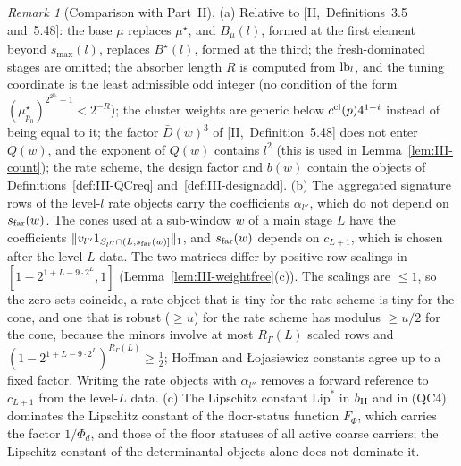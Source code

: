 \documentclass[10pt]{amsart}
\theoremstyle{definition}
\theoremstyle{remark}
\newtheorem{remark}[theorem]{Remark}
\begin{document}
\begin{remark}[Comparison with Part~II]\label{rem:III-Tfincomp}
(a) Relative to [II,~Definitions~3.5 and~5.48]: the base $\mu$ replaces
$\mu^\star$, and $B_\mu(l)$, formed at the first element beyond $s_{\max}(l)$,
replaces $B^\star(l)$, formed at the third; the fresh-dominated stages are
omitted; the absorber length $R$ is computed from ${\rm lb}_l$, and the tuning
coordinate is the least admissible odd integer (no condition of the form
$(\mu^\star_{p_0})^{2^{2^{p_0}}-1}<2^{-R}$); the cluster weights are generic
below $c^{\rm cl}(p)4^{1-i}$ instead of being equal to it; the factor
$\bar D(w)^3$ of [II,~Definition~5.48] does not enter $Q(w)$, and the
exponent of $Q(w)$ contains $l^2$ (this is used in
Lemma~\ref{lem:III-count}); the rate scheme, the design factor and $b(w)$
contain the objects of Definitions~\ref{def:III-QCreq}
and~\ref{def:III-designadd}.
(b) The aggregated signature rows of the level-$l$ rate objects carry the
coefficients $\alpha_{l''}$, which do not depend on $s_{\rm far}(w)$.  The cones
used at a sub-window $w$ of a main stage $L$ have the coefficients
$\|v_{l''}1_{S_{l''}\cap(L,s_{\rm far}(w)]}\|_1$, and $s_{\rm far}(w)$ depends on
$c_{L+1}$, which is chosen after the level-$L$ data.  The two matrices differ by
positive row scalings in $[1-2^{1+L-9\cdot2^L},1]$
(Lemma~\ref{lem:III-weightfree}(c)).  The scalings are $\le1$, so the zero
sets coincide, a rate object that is tiny for the rate scheme is tiny for
the cone, and one that is robust ($\ge u$) for the rate scheme has modulus
$\ge u/2$ for the cone, because the minors involve at most $R_\Gamma(L)$
scaled rows and $(1-2^{1+L-9\cdot2^L})^{R_\Gamma(L)}\ge\frac12$; Hoffman
\cite{Hoffman} and {\L}ojasiewicz constants agree up to a fixed factor.
Writing the rate objects with $\alpha_{l''}$ removes a forward reference to
$c_{L+1}$ from the level-$L$ data.
(c) The Lipschitz constant $\mathrm{Lip}^*$ in $b_{\rm II}$ and in (QC4) dominates
the Lipschitz constant of the floor-status function $F_\Phi$, which carries the
factor $1/\Phi_d$, and those of the floor statuses of all active coarse
carriers; the Lipschitz constant of the determinantal objects alone does not
dominate it.
\end{remark}
\end{document}
